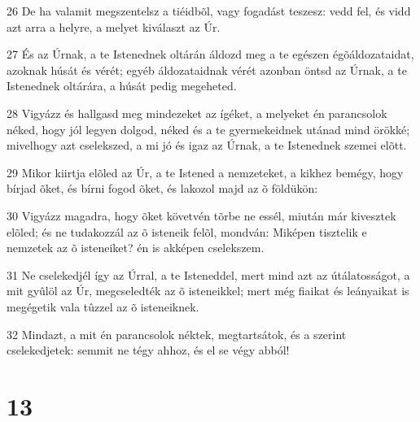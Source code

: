 \par 26 De ha valamit megszentelsz a tiéidbõl, vagy fogadást teszesz: vedd fel, és vidd azt arra a helyre, a melyet kiválaszt az Úr.
\par 27 És az Úrnak, a te Istenednek oltárán áldozd meg a te egészen égõáldozataidat, azoknak húsát és vérét; egyéb áldozataidnak vérét azonban öntsd az Úrnak, a te Istenednek oltárára, a húsát pedig megeheted.
\par 28 Vigyázz és hallgasd meg mindezeket az ígéket, a melyeket én parancsolok néked, hogy jól legyen dolgod, néked és a te gyermekeidnek utánad mind örökké; mivelhogy azt cselekszed, a mi jó és igaz az Úrnak, a te Istenednek szemei elõtt.
\par 29 Mikor kiirtja elõled az Úr, a te Istened a nemzeteket, a kikhez bemégy, hogy bírjad õket, és bírni fogod õket, és lakozol majd az õ földükön:
\par 30 Vigyázz magadra, hogy õket követvén tõrbe ne essél, miután már kivesztek elõled; és ne tudakozzál az õ isteneik felõl, mondván: Miképen tisztelik e nemzetek az õ isteneiket? én is akképen cselekszem.
\par 31 Ne cselekedjél így az Úrral, a te Isteneddel, mert mind azt az útálatosságot, a mit gyûlöl az Úr, megcseledték az õ isteneikkel; mert még fiaikat és leányaikat is megégetik vala tûzzel az õ isteneiknek.
\par 32 Mindazt, a mit én parancsolok néktek, megtartsátok, és a szerint cselekedjetek: semmit ne tégy ahhoz, és el se végy abból!

\chapter{13}

